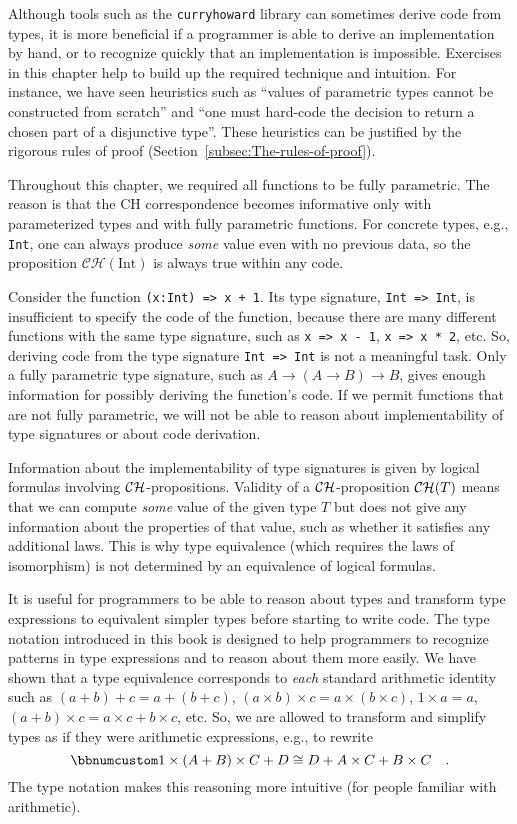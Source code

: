 Although tools such as the \texttt{curryhoward} library can sometimes
derive code from types, it is more beneficial if a programmer is able
to derive an implementation by hand, or to recognize quickly that
an implementation is impossible. Exercises in this chapter help to
build up the required technique and intuition. For instance, we have
seen heuristics such as \textsf{``}values of parametric types cannot be constructed
from scratch\textsf{''} and \textsf{``}one must hard-code the decision to return a
chosen part of a disjunctive type\textsf{''}. These heuristics can be justified
by the rigorous rules of proof (Section~\ref{subsec:The-rules-of-proof}). 

Throughout this chapter, we required all functions to be fully parametric.
The reason is that the CH correspondence becomes informative only
with parameterized types and with fully parametric functions. For
concrete types, e.g., \lstinline!Int!, one can always produce \emph{some}
value even with no previous data, so the proposition $\mathcal{CH}(\text{Int})$
is always true within any code.

Consider the function \lstinline!(x:Int) => x + 1!. Its type signature,
\lstinline!Int => Int!, is insufficient to specify the code of the
function, because there are many different functions with the same
type signature, such as \lstinline!x => x - 1!, \lstinline!x => x * 2!,
etc. So, deriving code from the type signature \lstinline!Int => Int!
is not a meaningful task. Only a fully parametric type signature,
such as $A\rightarrow\left(A\rightarrow B\right)\rightarrow B$, gives
enough information for possibly deriving the function\textsf{'}s code. If we
permit functions that are not fully parametric, we will not be able
to reason about implementability of type signatures or about code
derivation.

Information about the implementability of type signatures is given
by logical formulas involving ${\cal CH}$-propositions. Validity
of a ${\cal CH}$-proposition ${\cal CH}(T)$ means that we can compute
\emph{some} value of the given type $T$ but does not give any information
about the properties of that value, such as whether it satisfies any
additional laws. This is why type equivalence (which requires the
laws of isomorphism) is not determined by an equivalence of logical
formulas.

It is useful for programmers to be able to reason about types and
transform type expressions to equivalent simpler types before starting
to write code. The type notation introduced in this book is designed
to help programmers to recognize patterns in type expressions and
to reason about them more easily. We have shown that a type equivalence
corresponds to \emph{each} standard arithmetic identity such as $\left(a+b\right)+c=a+\left(b+c\right)$,
$\left(a\times b\right)\times c=a\times(b\times c)$, $1\times a=a$,
$\left(a+b\right)\times c=a\times c+b\times c$, etc. So, we are allowed
to transform and simplify types as if they were arithmetic expressions,
e.g., to rewrite
\[
\bbnum 1\times\left(A+B\right)\times C+D\cong D+A\times C+B\times C\quad.
\]
The type notation makes this reasoning more intuitive (for people
familiar with arithmetic). 

